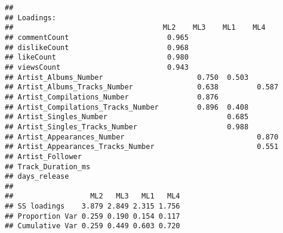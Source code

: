 \documentclass[
]{article}
\newenvironment{Shaded}{\begin{snugshade}}{\end{snugshade}}
\newcommand{\DataTypeTok}[1]{\textcolor[rgb]{0.13,0.29,0.53}{#1}}
\newcommand{\DecValTok}[1]{\textcolor[rgb]{0.00,0.00,0.81}{#1}}
\newcommand{\KeywordTok}[1]{\textcolor[rgb]{0.13,0.29,0.53}{\textbf{#1}}}
\newcommand{\NormalTok}[1]{#1}
\newcommand{\OperatorTok}[1]{\textcolor[rgb]{0.81,0.36,0.00}{\textbf{#1}}}
\newcommand{\StringTok}[1]{\textcolor[rgb]{0.31,0.60,0.02}{#1}}
\begin{document}
\begin{Shaded}
\end{Shaded}

\begin{verbatim}
## 
## Loadings:
##                                   ML2    ML3    ML1    ML4   
## commentCount                       0.965                     
## dislikeCount                       0.968                     
## likeCount                          0.980                     
## viewsCount                         0.943                     
## Artist_Albums_Number                      0.750  0.503       
## Artist_Albums_Tracks_Number               0.638         0.587
## Artist_Compilations_Number                0.876              
## Artist_Compilations_Tracks_Number         0.896  0.408       
## Artist_Singles_Number                            0.685       
## Artist_Singles_Tracks_Number                     0.988       
## Artist_Appearances_Number                               0.870
## Artist_Appearances_Tracks_Number                        0.551
## Artist_Follower                                              
## Track_Duration_ms                                            
## days_release                                                 
## 
##                  ML2   ML3   ML1   ML4
## SS loadings    3.879 2.849 2.315 1.756
## Proportion Var 0.259 0.190 0.154 0.117
## Cumulative Var 0.259 0.449 0.603 0.720
\end{verbatim}

\begin{Shaded}
\end{Shaded}
\end{document}
